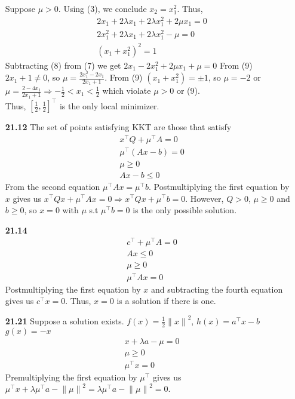 \documentclass[10pt]{article}
\begin{document}
\begin{enumerate}
    Suppose $\mu>0$. Using (3), we conclude $x_2=x_1^2$. Thus, 
    \begin{align}
        &2x_1+2\lambda x_1+2\lambda x_1^2+2\mu x_1=0\\
        & 2x_1^2+2\lambda x_1+2\lambda x_1^2-\mu=0\\
        &{(x_1+x_1^2)}^2=1
    \end{align}
    Subtracting (8) from (7) we get $2x_1-2x_1^2+2\mu x_1+\mu=0$ From (9) $2x_1+1\neq 0$, so $\mu=\frac{2x_1^2-2x_1}{2x_1+1}$. From (9) $(x_1+x_1^2)=\pm 1$, so $\mu=-2$ or $\mu=\frac{2-4x_1}{2x_1+1}\Rightarrow -\frac{1}{2}<x_1<\frac{1}{2}$ which violate $\mu>0$ or (9). \\
    Thus, ${[\frac{1}{2},\frac{1}{2}]}^\top$ is the only local minimizer.
    \item [\textbf{21.12}] The set of points satisfying KKT are those that satisfy
    \begin{align*}
        &x^\top Q+\mu^\top A=0\\
        &\mu^\top (Ax-b)=0\\
        &\mu\ge0\\
        &Ax-b\le 0
    \end{align*}
    From the second equation $\mu^\top Ax=\mu^\top b$. Postmultiplying the first equation by $x$ gives us $x^\top Q x+\mu^\top Ax=0\Rightarrow x^\top Q x+\mu^\top b=0$. However, $Q>0$, $\mu\ge0$ and $b\ge 0$, so $x=0$ with $\mu$ s.t $\mu^\top b=0$ is the only possible solution. 
    \item [\textbf{21.14}] \begin{align*}
        &c^\top+\mu^\top A=0\\
        &Ax\le0\\
        &\mu\ge 0\\
        &\mu^\top Ax=0
    \end{align*}
    Postmultiplying the first equation by $x$ and subtracting the fourth equation gives us $c^\top x=0$. Thus, $x=0$ is a solution if there is one.
    \item [\textbf{21.21}] Suppose a solution exists. $f(x)=\frac{1}{2}{\lVert x\rVert}^2$, $h(x)=a^\top x-b$ $g(x)=-x$
    \begin{align*}
        &x+\lambda a-\mu=0\\
        &\mu\ge 0\\
        &\mu^\top x=0
    \end{align*}
    Premultiplying the first equation by $\mu^\top$ gives us $\mu^\top x +\lambda\mu^\top a-{\lVert \mu\rVert}^2=\lambda\mu^\top a-{\lVert \mu\rVert}^2=0$.

\end{enumerate}
\end{document}
